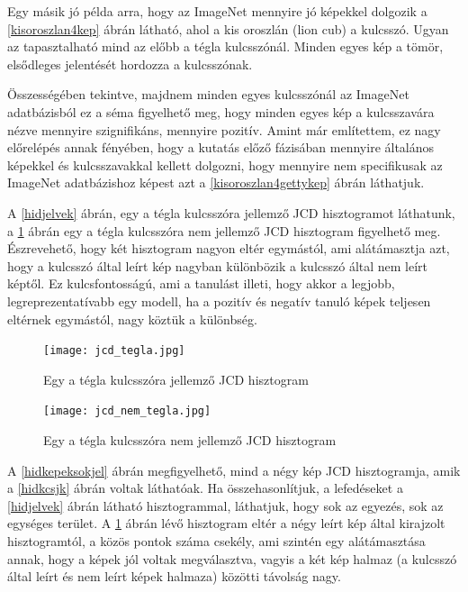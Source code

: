 \documentclass[12pt, a4paper, oneside]{book}
\theoremstyle{tetel}
\begin{document}
	Egy másik jó példa arra, hogy az ImageNet \cite{3} mennyire jó képekkel dolgozik a \ref{kisoroszlan4kep} ábrán látható, ahol a kis oroszlán (lion cub) a kulcsszó. Ugyan az tapasztalható mind az előbb a tégla kulcsszónál. Minden egyes kép a tömör, elsődleges jelentését hordozza a kulcsszónak.

	Összességében tekintve, majdnem minden egyes kulcsszónál az ImageNet \cite{3} adatbázisból ez a séma figyelhető meg, hogy minden egyes kép a kulcsszavára nézve mennyire szignifikáns, mennyire pozitív. Amint már említettem, ez nagy előrelépés annak fényében, hogy a kutatás előző fázisában mennyire általános képekkel és kulcsszavakkal kellett dolgozni, hogy mennyire nem specifikusak az ImageNet \cite{3} adatbázishoz képest azt a \ref{kisoroszlan4gettykep} ábrán láthatjuk. 

	A \ref{hidjelvek} ábrán, egy a tégla kulcsszóra jellemző JCD hisztogramot láthatunk, a \ref{hidnemjelvek} ábrán egy a tégla kulcsszóra nem jellemző JCD hisztogram figyelhető meg. Észrevehető, hogy két hisztogram nagyon eltér egymástól, ami alátámasztja azt, hogy a kulcsszó által leírt kép nagyban különbözik a kulcsszó által nem leírt képtől. Ez kulcsfontosságú, ami a tanulást illeti, hogy akkor a legjobb, legreprezentatívabb egy modell, ha a pozitív és negatív tanuló képek teljesen eltérnek egymástól, nagy köztük a különbség.

\vspace{0.7cm}

\begin{figure}[h]
\begin{center}
\texttt{[image: jcd\_tegla.jpg]}
\caption{{ Egy a tégla kulcsszóra jellemző JCD hisztogram}}
\label{hidjelvek}

\vspace{0.7cm}

\texttt{[image: jcd\_nem\_tegla.jpg]}
\caption{{ Egy a tégla kulcsszóra nem jellemző JCD hisztogram}}
\label{hidnemjelvek}
\end{center}
\end{figure}

	A \ref{hidkepeksokjel} ábrán megfigyelhető, mind a négy kép JCD hisztogramja, amik a \ref{hidkcsjk} ábrán voltak láthatóak. Ha összehasonlítjuk, a lefedéseket a \ref{hidjelvek} ábrán látható hisztogrammal, láthatjuk, hogy sok az egyezés, sok az egységes terület. A \ref{hidnemjelvek} ábrán lévő hisztogram eltér a négy leírt kép által kirajzolt hisztogramtól, a közös pontok száma csekély, ami szintén egy alátámasztása annak, hogy a képek jól voltak megválasztva, vagyis a két kép halmaz (a kulcsszó által leírt és nem leírt képek halmaza) közötti távolság nagy.
\end{document}
